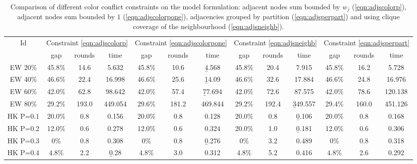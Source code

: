 \begin{table}
\centering

	\begin{tabular}{|c|ccc|ccc|ccc|ccc|}
	\hline
	\multicolumn{1}{|c|}{Id} & \multicolumn{3}{|c|}{Constraint \ref{eqn:adjscolorp}} & \multicolumn{3}{|c|}{Constraint \ref{eqn:adjscolorpone}} & \multicolumn{3}{|c|}{Constraint \ref{eqn:adjsneighb}} & \multicolumn{3}{|c|}{Constraint \ref{eqn:adjsperpart}} 
	\\
	& gap & rounds & time & gap & rounds & time & gap & rounds & time & gap & rounds & time 
	\\
	\hline
	EW 20\% & 45.8\% & 14.6 & 5.632 & 45.8\% & 10.6 & \b{4.568} & 45.8\% & 20.4 & 7.915 & 45.8\% & 16.2 & 5.728
	\\
	EW 40\% & 46.6\% & 22.4 & 16.998 & 46.6\% & 25.6 & \b{14.09} & 46.6\% & 32.6 & 17.884 &46.6\% & 24.8 & 16.976
	\\
	EW 60\% & 42.0\% & 62.8 & 98.642 & 42.0\% & 57.4 & \b{77.694} & 42.0\% & 72.6 & 87.575 & 42.0\% & 78.6 & 120.138
	\\
	EW 80\% &29.2\% & 193.0 & 449.054 &29.6\% & 181.2 & 469.844 &29.2\% & 192.4 & \b{349.557} &29.4\% & 160.0 & 451.126
	\\
	\hline
	HK P=0.1 &  20.0\% &  0.8 & 0.156 &  20.0\% &  0.8 & 0.128 &  20.0\% &  0.8 & \b{0.106} &  20.0\% &  0.8 & 0.168
	\\
	HK P=0.2 & 12.0\% &  0.6 & 0.278 & 12.0\% &  0.6 & 0.324 &  20.0\% &  1.0 & \b{0.181} & 12.0\% &  0.6 & 0.306
	\\
	HK P=0.3 &  0\% &  0.8 & 0.308 &  0\% &  0.8 & \b{0.276} &  0\% &  3.2 & 0.489 &  0\% &  0.8 & 0.318
	\\
	HK P=0.4 & 4.8\% &  2.2 & \b{0.28} & 4.8\% &  3.0 & 0.312 & 4.8\% &  5.2 & 0.416 & 4.8\% &  2.6 & 0.292
	\\
	\hline 
	 \end{tabular}
	
	\caption{Comparison of different color conflict constraints on the model formulation: adjacent nodes sum bounded by $w_j$ (\ref{eqn:adjscolorp}), adjacent nodes sum bounded by $1$ (\ref{eqn:adjscolorpone}), adjacencies grouped by partition (\ref{eqn:adjsperpart}) and using clique coverage of the neighbourhood (\ref{eqn:adjsneighb}).}
	\label{table:modelsadj}
\end{table}



